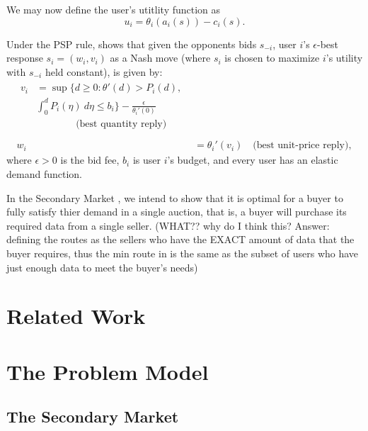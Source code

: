 \documentclass[12pt]{article}
\theoremstyle{definition}
\begin{document}
\begin{multicols}{2}
We may now define the user's utitlity function as
\begin{equation}\label{utility}
    u_i = \theta_i(a_i(s)) - c_i(s).
\end{equation}

Under the PSP rule, \cite{lazar} shows that given the opponents bids $s_{-i}$,
user $i$'s $\epsilon$-best response $s_i = (w_i, v_i)$ as a Nash move
(where $s_i$ is chosen to maximize $i$'s utility with $s_{-i}$ held constant), is
given by:
\begin{align}
\begin{split}
    v_i &= \sup\bigg\lbrace d \ge 0 : \theta '(d) > P_i(d), \\ 
&\displaystyle\int_0^d P_i(\eta) \ d\eta \le b_i\bigg\rbrace -
\frac{\epsilon}{\theta_i'(0)} \\
&\qquad\qquad \text{(best quantity reply)} \\
\end{split}\\
    w_i &= \theta_i'(v_i) \quad \text{(best unit-price reply)},
\end{align}
where $\epsilon > 0$ is the bid fee, $b_i$ is user $i$'s budget, and every user
has an elastic demand function.

In the Secondary Market \cite{zheng}, we intend to show that it is optimal for a
buyer to fully satisfy thier demand in a single auction, that is, a buyer
will purchase its required data from a single seller. (WHAT?? why do I think
this? Answer: defining the routes as the sellers who have the EXACT amount of
data that the buyer requires, thus the min route in \cite{lazar} is the same as the subset of
users who have just enough data to meet the buyer's needs)

\section{Related Work}
 

\section{The Problem Model}
\subsection{The Secondary Market}


\end{multicols}
\end{document}
